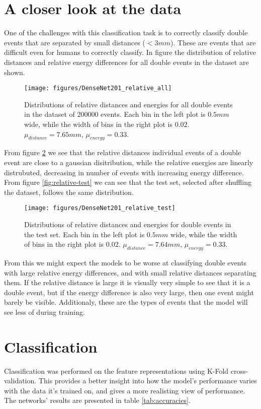 \documentclass[12pt, notitlepage]{article}
\begin{document}
\section{A closer look at the data}
One of the challenges with this classification task is to correctly classify double events that
are separated by small distances ($< 3mm$). These are events that are difficult even for
humans to correctly classify. In figure \label{fig:relative-all} the distribution of relative
distances and relative energy differences for all double events in the dataset are shown.
\begin{figure}
    \texttt{[image: figures/DenseNet201\_relative\_all]}
    \caption{Distributions of relative distances and energies for all double events in the dataset
    of 200000 events. Each bin in the left plot is $0.5mm$ wide, while the width of bins in the
    right plot is $0.02$. $\mu_{distance}=7.65mm$, $\mu_{energy}=0.33$.}
    \label{fig:relative-all}
\end{figure}
From figure \ref{fig:relative-all} we see that the relative distances individual events of a
double event are close to a gaussian disitribution, while the relative energies are linearly
distrubuted, decreasing in number of events with increasing energy difference.
From figure \ref{fig:relative-test} we can see that the test set, selected after shuffling the
dataset, follows the same distribution.
\begin{figure}
    \texttt{[image: figures/DenseNet201\_relative\_test]}
    \caption{Distributions of relative distances and energies for double events in the test set. 
    Each bin in the left plot is $0.5mm$ wide, while the width of bins in the
    right plot is $0.02$. $\mu_{distance}=7.64mm$, $\mu_{energy}=0.33$.}
    \label{fig:relative-all}
\end{figure}
From this we might expect the models to be worse at classifying double events with large relative
energy differences, and with small relative distances separating them. If the relative distance
is large it is visually very simple to see that it is a double event, but if the energy difference
is also very large, then one event might barely be visible. Additionaly, these are the types of events
that the model will see less of during training.

\section{Classification}
Classification was performed on the feature representations using K-Fold cross-validation.
This provides a better insight into how the model's performance varies with the data it's
trained on, and gives a more realisting view of performance.
The networks' results are presented in table \ref{tab:accuracies}.
\end{document}
